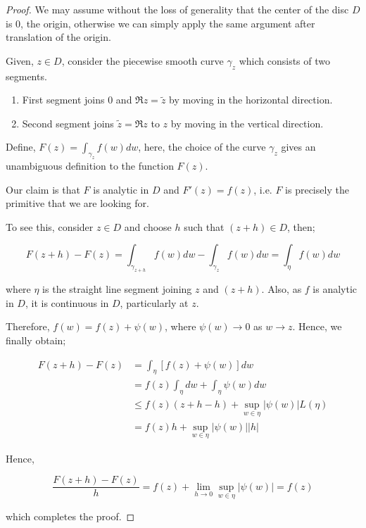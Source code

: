 \documentclass[12pt]{article}
\theoremstyle{definition}
\begin{document}
\begin{proof}
    We may assume without the loss of generality that the center of the disc $D$ is $0$, the origin, otherwise we can simply apply the same argument after translation of the origin.

    Given, $z \in D$, consider the piecewise smooth curve $\gamma_z$ which consists of two segments.
    \begin{enumerate}
        \item First segment joins $0$ and $\Re z = \tilde{z}$ by moving in the horizontal direction.
        \item Second segment joins $\tilde{z} = \Re z$ to $z$ by moving in the vertical direction.
    \end{enumerate}

    Define, $F(z) = \int_{\gamma_z} f(w)dw$, here, the choice of the curve $\gamma_z$ gives an unambiguous definition to the function $F(z)$.

    Our claim is that $F$ is analytic in $D$ and $F'(z) = f(z)$, i.e. $F$ is precisely the primitive that we are looking for.

    To see this, consider $z \in D$ and choose $h$ such that $(z + h) \in D$, then;

    $$F(z + h) - F(z) = \int_{\gamma_{z+h}} f(w)dw - \int_{\gamma_{z}} f(w)dw = \int_{\eta} f(w)dw$$

    where $\eta$ is the straight line segment joining $z$ and $(z + h)$. Also, as $f$ is analytic in $D$, it is continuous in $D$, particularly at $z$. 

    Therefore, $f(w) = f(z) + \psi(w)$, where $\psi(w) \rightarrow 0$ as $w \rightarrow z$. Hence, we finally obtain;

    \begin{align*}
        F(z+h) - F(z)
        & = \int_{\eta} \left[ f(z) + \psi(w) \right]dw\\
        & = f(z) \int_{\eta} dw + \int_{\eta} \psi(w)dw\\
        & \leq f(z) (z + h - h) + \sup_{w \in \eta} \vert \psi(w) \vert L(\eta)\\
        & = f(z) h +  \sup_{w \in \eta} \vert \psi(w) \vert \vert h\vert
    \end{align*}

    Hence,

    $$\dfrac{F(z + h) - F(z)}{h} = f(z) + \lim_{h \rightarrow 0}\sup_{w \in \eta} \vert \psi(w) \vert = f(z)$$

    which completes the proof.
\end{proof}
\end{document}
